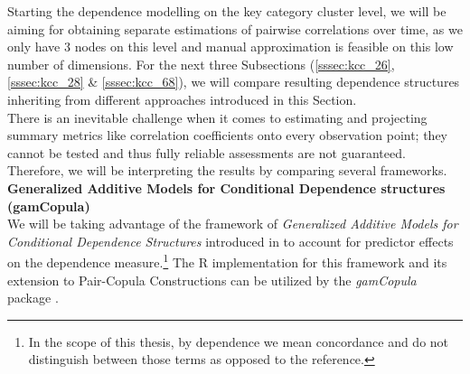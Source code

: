 
Starting the dependence modelling on the key category cluster level, we will be aiming for obtaining separate estimations of pairwise correlations over time, as we only have 3 nodes on this level and manual approximation is feasible on this low number of dimensions. %
For the next three Subsections (\ref{sssec:kcc_26}, \ref{sssec:kcc_28} \& \ref{sssec:kcc_68}), we will compare resulting dependence structures inheriting from different approaches introduced in this Section.\\

There is an inevitable challenge when it comes to estimating and projecting summary metrics like correlation coefficients onto every observation point; they cannot be tested and thus fully reliable assessments are not guaranteed. Therefore, we will be interpreting the results by comparing several frameworks. \\



\textbf{Generalized Additive Models for Conditional Dependence structures (gamCopula)}\\
We will be taking advantage of the framework of \textit{Generalized Additive Models for Conditional Dependence Structures} introduced in \cite{vatter2015generalized} to account for predictor effects on the dependence measure.\footnote{In the scope of this thesis, by dependence we mean concordance and do not distinguish between those terms as opposed to the reference.} The R implementation for this framework and its extension to Pair-Copula Constructions \citep{vatter2018generalized} can be utilized by the \textit{gamCopula} package \citep{vatter2019gamcopula}. \\


